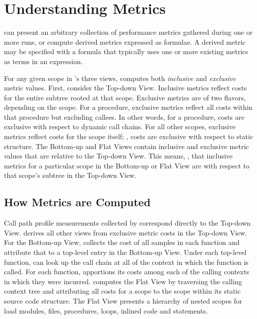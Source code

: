 \section{Understanding Metrics}

\hpcviewer{} can present an arbitrary collection of performance metrics gathered during one or more runs, or compute derived metrics expressed as formulae. A derived metric may be specified with a formula that typically uses one or more existing metrics as terms in an expression.

For any given scope in \hpcviewer{}'s three views, \hpcviewer{} computes both \emph{inclusive} and \emph{exclusive} metric values.
First, consider the Top-down View.
Inclusive metrics reflect costs for the entire subtree rooted at that scope.
Exclusive metrics are of two flavors, depending on the scope.
For a procedure, exclusive metrics reflect all costs within that procedure but excluding callees.
In other words, for a procedure, costs are exclusive with respect to dynamic call chains.
For all other scopes, exclusive metrics reflect costs for the scope itself; \ie{}, costs are exclusive with respect to static structure.
The Bottom-up and Flat Views contain inclusive and exclusive metric values that are relative to the Top-down View.
This means, \eg{}, that inclusive metrics for a particular scope in the Bottom-up or Flat View are with respect to that scope's subtree in the Top-down View.



\subsection{How Metrics are Computed}

Call path profile measurements collected by \hpcrun{} correspond directly to the Top-down View.
\hpcviewer{} derives all other views from exclusive metric costs in the Top-down View.
For the Bottom-up View, \hpcviewer{} collects the cost of all samples in each function and attribute that to a top-level entry in the Bottom-up View.
Under each top-level function, \hpcviewer{} can look up the call chain at all of the context in which the function is called.
For each function, \hpcviewer{} apportions its costs among each of the calling contexts in which they were incurred.
\hpcviewer{} computes the Flat View by traversing the calling context tree and attributing all costs for a scope to the scope within its static source code structure.
The Flat View presents a hierarchy of nested scopes for load modules, files, procedures, loops, inlined code and statements.


